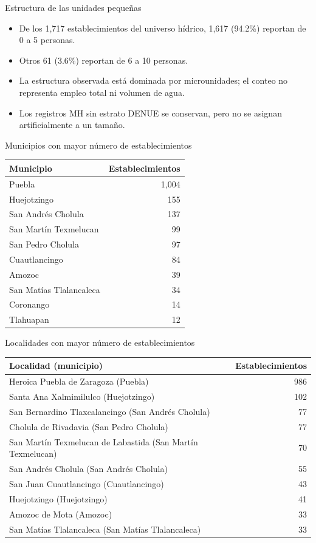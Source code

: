 \documentclass[aspectratio=169]{beamer}
\begin{document}
\begin{frame}{Estructura de las unidades pequeñas}
\begin{itemize}
\item De los 1,717 establecimientos del universo hídrico,
1,617 (94.2\%) reportan de 0 a 5 personas.
\item Otros 61 (3.6\%) reportan de 6 a 10 personas.
\item La estructura observada está dominada por microunidades; el conteo no representa empleo total ni volumen de agua.
\item Los registros MH sin estrato DENUE se conservan, pero no se asignan artificialmente a un tamaño.
\end{itemize}
\end{frame}
\begin{frame}{Municipios con mayor número de establecimientos}
\centering\small
\begin{tabular}{lr}\toprule Municipio & Establecimientos\\\midrule
Puebla & 1,004\\
Huejotzingo & 155\\
San Andrés Cholula & 137\\
San Martín Texmelucan & 99\\
San Pedro Cholula & 97\\
Cuautlancingo & 84\\
Amozoc & 39\\
San Matías Tlalancaleca & 34\\
Coronango & 14\\
Tlahuapan & 12\\
\bottomrule\end{tabular}
\end{frame}
\begin{frame}{Localidades con mayor número de establecimientos}
\centering\scriptsize
\begin{tabular}{lr}\toprule Localidad (municipio) & Establecimientos\\\midrule
Heroica Puebla de Zaragoza (Puebla) & 986\\
Santa Ana Xalmimilulco (Huejotzingo) & 102\\
San Bernardino Tlaxcalancingo (San Andrés Cholula) & 77\\
Cholula de Rivadavia (San Pedro Cholula) & 77\\
San Martín Texmelucan de Labastida (San Martín Texmelucan) & 70\\
San Andrés Cholula (San Andrés Cholula) & 55\\
San Juan Cuautlancingo (Cuautlancingo) & 43\\
Huejotzingo (Huejotzingo) & 41\\
Amozoc de Mota (Amozoc) & 33\\
San Matías Tlalancaleca (San Matías Tlalancaleca) & 33\\
\bottomrule\end{tabular}
\end{frame}
\end{document}
